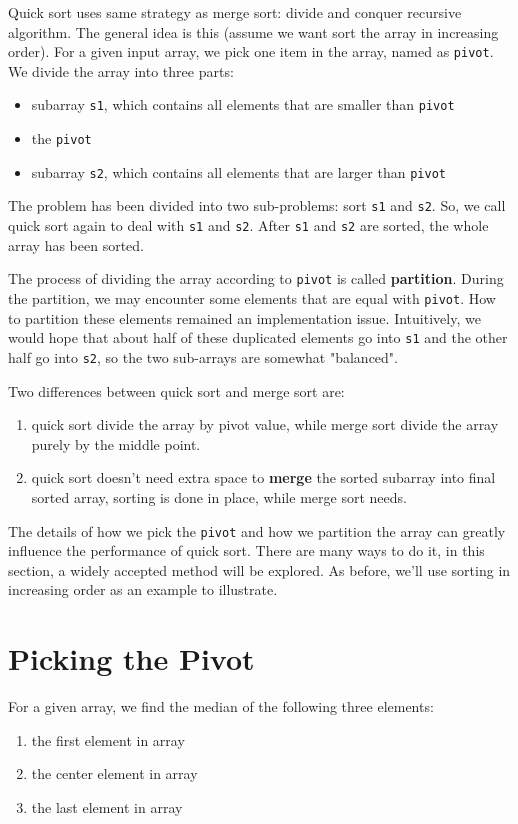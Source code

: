 \documentclass[12pt]{book}
\begin{document}
Quick sort uses same strategy as merge sort: divide and conquer recursive algorithm. The general idea is this (assume we want sort the array in increasing order). For a given input array, we pick one item in the array, named as \texttt{pivot}. We divide the array into three parts:
\begin{itemize}
\item subarray \texttt{s1}, which contains all elements that are smaller than \texttt{pivot}
\item the \texttt{pivot}
\item subarray \texttt{s2}, which contains all elements that are larger than \texttt{pivot}
\end{itemize}
The problem has been divided into two sub-problems: sort \texttt{s1} and \texttt{s2}. So, we call quick sort again to deal with \texttt{s1} and \texttt{s2}. After \texttt{s1} and \texttt{s2} are sorted, the whole array has been sorted.

The process of dividing the array according to \texttt{pivot} is called \textbf{partition}. During the partition, we may encounter some elements that are equal with \texttt{pivot}. How to partition these elements remained an implementation issue. Intuitively, we would hope that about half of these duplicated elements go into \texttt{s1} and the other half go into \texttt{s2}, so the two sub-arrays are somewhat "balanced".

Two differences between quick sort and merge sort are:
\begin{enumerate}
\item quick sort divide the array by pivot value, while merge sort divide the array purely by the middle point.
\item quick sort doesn't need extra space to \textbf{merge} the sorted subarray into final sorted array, sorting is done in place, while merge sort needs.
\end{enumerate}

The details of how we pick the \texttt{pivot} and how we partition the array can greatly influence the performance of quick sort. There are many ways to do it, in this section, a widely accepted method will be explored. As before, we'll use sorting in increasing order as an example to illustrate.
\section{Picking the Pivot}
\label{sec:org9d6f405}
For a given array, we find the median of the following three elements:
\begin{enumerate}
\item the first element in array
\item the center element in array
\item the last element in array
\end{enumerate}
\end{document}

